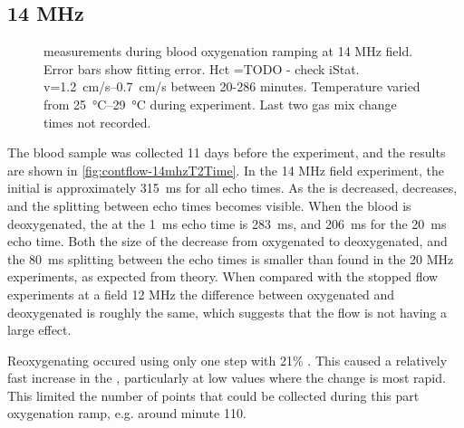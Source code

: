 \subsection{14 MHz}
\begin{figure}[ht]
\centering
{}
\caption[\Ttwo measurements during blood oxygenation ramping at 14 MHz field]{\Ttwo measurements during blood oxygenation ramping at 14 MHz field. Error bars show \Ttwo fitting error. Hct =TODO - check iStat. v=\SIrange{1.2}{0.7}{cm/s} between  20-286 minutes. Temperature varied from \SIrange{25}{29}{\celsius} during experiment. Last two gas mix change times not recorded.}
\label{fig:contflow-14mhzT2Time}
\end{figure}

The blood sample was collected 11 days before the experiment, and the results are shown in \autoref{fig:contflow-14mhzT2Time}.
In the 14 MHz field experiment, the initial \Ttwo is approximately \SI{315}{ms} for all echo times.
As the \SOtwo is decreased, \Ttwo decreases, and the splitting between echo times becomes visible.
When the blood is deoxygenated, the \Ttwo at the \SI{1}{ms} echo time is \SI{283}{ms}, and \SI{206}{ms} for the \SI{20}{ms} echo time.
Both the size of the decrease from  oxygenated to deoxygenated, and the \SI{80}{ms} splitting between the echo times is smaller than found in the 20 MHz experiments, as expected from theory.
When compared with the stopped flow experiments at a field 12 MHz the difference between oxygenated and deoxygenated is roughly the same, which suggests that the flow is not having a large effect.

Reoxygenating occured using only one step with 21\% \Otwo.
This caused a relatively fast increase in the \SOtwo, particularly at low \SOtwo values where the \Ttwo change is most rapid.
This limited the number of points that could be collected during this part oxygenation ramp, e.g. around minute 110.

